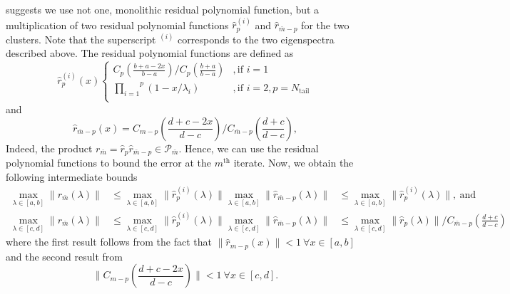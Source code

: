 \citeauthor{cg_sharpened_convrate_Axelsson1976} suggests we use not one, monolithic residual polynomial function, but a multiplication of two residual polynomial functions $\hat{r}^{(i)}_p$ and $\hat{r}_{\bar{m}-p}$ for the two clusters. Note that the superscript $^{(i)}$ corresponds to the two eigenspectra described above. The residual polynomial functions are defined as
\begin{equation}
    \hat{r}^{(i)}_p (x)
    \begin{cases}
        C_p \left(\frac{b + a - 2x}{b - a}\right) / C_p\left(\frac{b + a}{b - a}\right)&, \text{if } i = 1\\
        \overset{p}{\underset{i=1}{\prod}} (1 - x/\lambda_i)&, \text{if } i = 2, p = N_{\text{tail}}\\
    \end{cases}
    \label{eq:residual_polynomial_rm}
\end{equation}
and
\begin{equation}
    \hat{r}_{{\bar{m}}-p} (x) = C_{m-p} \left(\frac{d + c - 2x}{d - c}\right) / C_{{\bar{m}}-p}\left(\frac{d + c}{d - c}\right),
    \label{eq:residual_polynomial_rpm}
\end{equation}
Indeed, the product $r_{\bar{m}} = \hat{r}_p \hat{r}_{\bar{m}-p} \in \mathcal{P}_{\bar{m}}$. Hence, we can use the residual polynomial functions to bound the error at the $m^{\text{th}}$ iterate. Now, we obtain the following intermediate bounds
\begin{subequations}
    \begin{align}
        \max_{\lambda \in [a,b]} \|r_{\bar{m}}(\lambda)\| &\leq \max_{\lambda \in [a,b]} \|\hat{r}^{(i)}_p(\lambda)\| \max_{\lambda \in [a,b]} \|\hat{r}_{\bar{m}-p}(\lambda)\| &\leq \max_{\lambda \in [a,b]} \|\hat{r}^{(i)}_p(\lambda)\|, \ \text{and} \label{eq:residual_polynomial_bound_ab}\\
        \max_{\lambda \in [c,d]} \|r_{\bar{m}}(\lambda)\| &\leq \max_{\lambda \in [c,d]} \|\hat{r}^{(i)}_p(\lambda)\| \max_{\lambda \in [c,d]} \|\hat{r}_{\bar{m}-p}(\lambda)\| &\leq \max_{\lambda \in [c,d]} \|\hat{r}_{p}(\lambda)\|/C_{\bar{m}-p}\left(\frac{d+c}{d-c}\right) \label{eq:residual_polynomial_bound_cd}
    \end{align}
\end{subequations}
where the first result follows from the fact that $\|\hat{r}_{m-p}(x)\| < 1 \ \forall x \in [a,b]$ and the second result from 
\[
    \|C_{m-p}\left(\frac{d+c -2x}{d-c}\right)\| < 1 \ \forall x \in [c,d].
\]

